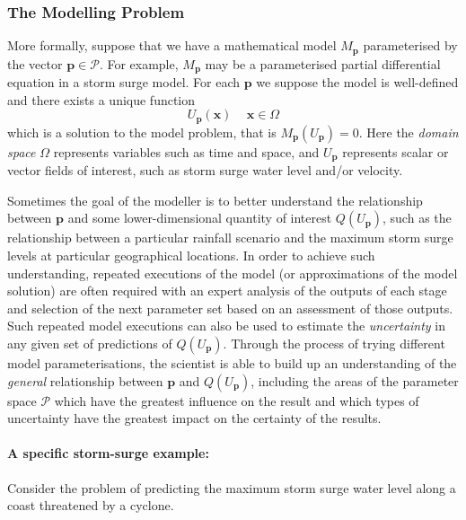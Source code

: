 \subsubsection*{The Modelling Problem}

More formally, suppose that we have a mathematical model
$M_{\mathbf{p}}$ parameterised by the vector
$\mathbf{p}\in\mathcal{P}$. For example, $M_{\mathbf{p}}$ may be a
parameterised partial differential equation %
in a storm surge model. For each $\mathbf{p}$ we suppose the model is
well-defined and there exists a unique function
\begin{equation}
  \label{eq:1}
  U_{\mathbf{p}}(\mathbf{x})\, \quad \mathbf{x}\in\Omega
\end{equation}
which is a solution to the model problem, that is $M_{\mathbf{p}}(U_{\mathbf{p}})=0$.
Here the \emph{domain space} $\Omega$ represents variables such as 
time and space, 
and $U_{\mathbf{p}}$ represents scalar or vector fields of interest, 
such as storm surge water level and/or velocity.    

Sometimes the goal of the modeller is to better understand the
relationship between $\mathbf{p}$ and some lower-dimensional quantity
of interest $Q(U_{\mathbf{p}})$, such as the relationship between a
particular rainfall scenario and the maximum storm surge levels at
particular geographical locations. In order to achieve such
understanding, repeated executions of the model (or approximations of the model solution) are often required
with an expert analysis of the outputs of each stage and selection of
the next parameter set based on an assessment of those outputs. Such
repeated model executions can also be used to estimate the
\emph{uncertainty} in any given set of predictions of
$Q(U_{\mathbf{p}})$. Through the process of trying different model
parameterisations, the scientist is able to build up an understanding
of the \emph{general} relationship between $\mathbf{p}$ and
$Q(U_{\mathbf{p}})$, including the areas of the parameter space
$\mathcal{P}$ which have the greatest influence on the result and
which types of uncertainty have the greatest impact on the certainty
of the results.

\paragraph*{A specific storm-surge example:}
Consider the problem of predicting the maximum 
storm surge water level along a coast threatened by a cyclone. 

